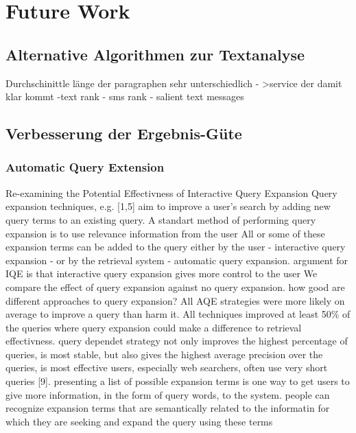 \section{Future Work}
\label{sec:futureWork}
 \subsection{Alternative Algorithmen zur Textanalyse}

 Durchschinittle länge der paragraphen sehr unterschiedlich - >service der damit klar kommt
 -text rank
 - sms rank
 - salient text messages


 \subsection{Verbesserung der Ergebnis-Güte}

  \subsubsection{Automatic Query Extension}
		Re-examining the Potential Effectivness of Interactive Query Expansion
  Query expansion techniques, e.g. [1,5] aim to improve a user's search by adding new query terms to an existing query. A standart method of performing query expansion is to use relevance information from the user
  All or some of these expansion terms can be added to the query either by the user - interactive query expansion - or by the retrieval system - automatic query expansion.
  argument for IQE is that interactive query expansion gives more control to the user
  We compare the effect of query expansion against no query expansion. how good are different approaches to query expansion? 
  All AQE strategies were more likely on average to improve a query than harm it. All techniques improved at least 50\% of the queries where query expansion could make a difference to retrieval effectivness.
  query dependet strategy not only improves the highest percentage of queries, is most stable, but also gives the highest average precision over the queries, is most effective
  users, especially web searchers, often use very short queries [9]. presenting a list of possible expansion terms is one way to get users to give more information, in the form of query words, to the system.
  people can recognize expansion terms that are semantically related to the informatin for which they are seeking and expand the query using these terms


